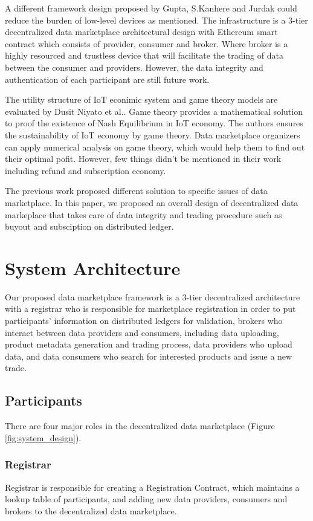 \documentclass[journal,10pt,a4paper]{IEEEtran}
\begin{document}
A different framework design proposed by Gupta, S.Kanhere and Jurdak\cite{3tierDataMarket} could reduce the burden of low-level devices as mentioned. The infrastructure is a 3-tier decentralized data marketplace architectural design with Ethereum smart contract which consists of provider, consumer and broker. Where broker is a highly resourced and trustless device that will facilitate the trading of data between the consumer and providers. However, the data integrity and authentication of each participant are still future work.

The utility structure of IoT econimic system and game theory models are evaluated by Dusit Niyato et al.\cite{UtilityStruct}. Game theory provides a mathematical solution to proof the existence of Nash Equilibrium in IoT economy. The authors ensures the sustainability of IoT economy by game theory. Data marketplace organizers can apply numerical analysis on game theory, which would help them to find out their optimal pofit. However, few things didn't be mentioned in their work including refund and subscription economy.

The previous work proposed different solution to specific issues of data marketplace. In this paper, we proposed an  overall design of decentralized data markeplace that takes care of data integrity and trading procedure such as buyout and subsciption on distributed ledger.

\section{\normalsize\textbf{System Architecture}}
Our proposed data marketplace framework is a 3-tier decentralized architecture with a registrar who is responsible for marketplace registration in order to put participants' information on distributed ledgers for validation, brokers who interact between data providers and consumers, including data uploading, product metadata generation and trading process, data providers who upload data, and data consumers who search for interested products and issue a new trade.

\subsection{Participants}
There are four major roles in the decentralized data marketplace (Figure \ref{fig:system_design}).

\subsubsection{Registrar}
Registrar is responsible for creating a Registration Contract, which maintains a lookup table of participants, and adding new data providers, consumers and brokers to the decentralized data marketplace.
\end{document}
